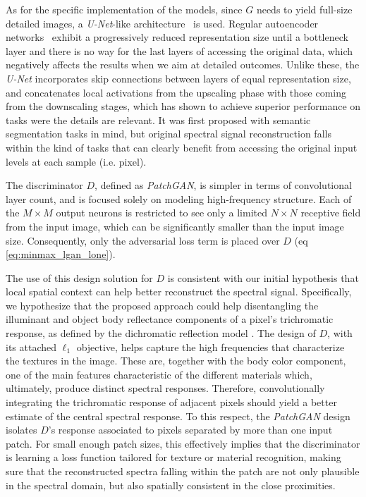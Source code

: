 \documentclass[10pt,twocolumn,letterpaper]{article}
\begin{document}
As for the specific implementation of the models, since $G$ needs to yield full-size detailed images, a \emph{U-Net}-like architecture~\cite{ronneberger_u-net:_2015} is used.
Regular autoencoder networks~\cite{kingma_auto-encoding_2013} exhibit a progressively reduced representation size until a bottleneck layer and there is no way for the last layers of accessing the original data, which negatively affects the results when we aim at detailed outcomes. 
Unlike these, the \emph{U-Net} incorporates skip connections between layers of equal representation size, and concatenates local activations from the upscaling phase with those coming from the downscaling stages, which has shown to achieve superior performance on tasks were the details are relevant.
It was first proposed with semantic segmentation tasks in mind, but original spectral signal reconstruction falls within the kind of tasks that can clearly benefit from accessing the original input  levels at each sample (i.e. pixel).

The discriminator $D$, defined as \emph{PatchGAN}, is simpler in terms of convolutional layer count, and is focused solely on modeling high-frequency structure. Each of the $M\times M$ output neurons is restricted to see only a limited $N\times N$ receptive field from the input image, which can be significantly smaller than the input image size.
Consequently, only the adversarial loss term is placed over $D$ (eq \ref{eq:minmax_lgan_lone}).

The use of this design solution for $D$ is consistent with our initial hypothesis that local spatial context can help better reconstruct the spectral signal. 
Specifically, we hypothesize that the proposed approach could help disentangling the illuminant and object body reflectance components of a pixel's trichromatic response, as defined by the dichromatic reflection model \cite{shafer_using_1985}.
The design of $D$, with its attached $\ell_1$ objective, helps capture the high frequencies that characterize the textures in the image.
These are, together with the body color component, one of the main features characteristic of the different materials which, ultimately, produce distinct spectral responses. Therefore, convolutionally integrating the trichromatic response of adjacent pixels should yield a better estimate of the central spectral response. 
To this respect, the \emph{PatchGAN} design isolates $D$'s response associated to pixels separated by more than one input patch.
For small enough patch sizes, this effectively implies that the discriminator is learning a loss function tailored for texture or material recognition, making sure that the reconstructed spectra falling within the patch are not only plausible in the spectral domain, but also spatially consistent in the close proximities. 
\end{document}
